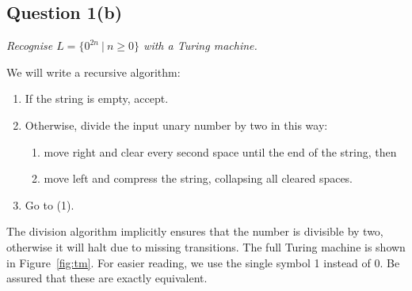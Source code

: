 \documentclass[a4paper]{article}
\begin{document}
\subsection*{Question 1(b)}
\begin{center}
  \textit{Recognise $L = \{0^{2n}~|~ n \ge 0\}$ with a Turing machine.}
\end{center}
We will write a recursive algorithm:
\begin{enumerate}[(1)]
  \setlength{\itemsep}{0pt}
  \item If the string is empty, accept.
  \item Otherwise, divide the input unary number by two in this way:
    \begin{enumerate}
      \item move right and clear every second space until the end of the string, then
      \item move left and compress the string, collapsing all cleared spaces.
    \end{enumerate}
  \item Go to (1).
\end{enumerate}
The division algorithm implicitly ensures that the number is divisible by two, otherwise it will halt
due to missing transitions.
The full Turing machine is shown in Figure~\ref{fig:tm}.
For easier reading, we use the single symbol 1 instead of 0.
Be assured that these are exactly equivalent.
\end{document}
